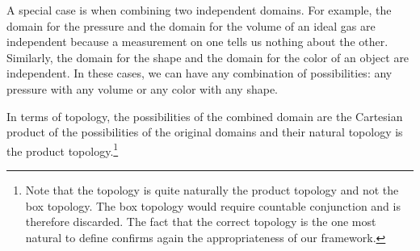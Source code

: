 \documentclass[11pt,letterpaper,fleqn]{memoir} %
\begin{document}
A special case is when combining two independent domains. For example, the domain for the pressure and the domain for the volume of an ideal gas are independent because a measurement on one tells us nothing about the other. Similarly, the domain for the shape and the domain for the color of an object are independent. In these cases, we can have any combination of possibilities: any pressure with any volume or any color with any shape.

In terms of topology, the possibilities of the combined domain are the Cartesian product of the possibilities of the original domains and their natural topology is the product topology.\footnote{Note that the topology is quite naturally the product topology and not the box topology. The box topology would require countable conjunction and is therefore discarded. The fact that the correct topology is the one most natural to define confirms again the appropriateness of our framework.}
\end{document}
